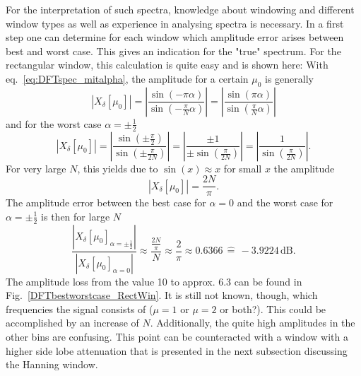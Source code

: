 \documentclass[11pt,a4paper,DIV=12]{scrartcl}
\begin{document}
For the interpretation of such spectra, knowledge about windowing and different
window types as well as experience in analysing spectra is necessary.
%
In a first step one can determine for each window which amplitude error arises
between best and worst case.
%
This gives an indication for the "true" spectrum.
%
For the rectangular window, this calculation is quite easy and is shown here:
%
With eq.~\eqref{eq:DFTspec_mitalpha}, the amplitude for a certain $\mu_0$ is
generally
%
\begin{equation}
|X_\delta[\mu_0]|=\left|\frac{\sin(-\pi\alpha)}{\sin\left(-\frac{\pi}{N}\alpha\right)}\right|
=\left|\frac{\sin(\pi\alpha)}{\sin\left(\frac{\pi}{N}\alpha\right)}\right|
\end{equation}
%
and for the worst case $\alpha=\pm\frac{1}{2}$
%
\begin{equation}
|X_\delta[\mu_0]|=\left|\frac{\sin\left(\pm\frac{\pi}{2}\right)}{\sin\left(\pm\frac{\pi}{2N}\right)}\right|
=\left|\frac{\pm1}{\pm\sin\left(\frac{\pi}{2N}\right)}\right|
=\left|\frac{1}{\sin\left(\frac{\pi}{2N}\right)}\right|.
\end{equation}
%
For very large $N$, this yields due to $\sin(x)\approx x$ for small $x$ the
amplitude
%
\begin{equation}
|X_\delta[\mu_0]|=\frac{2N}{\pi}.
\end{equation}
%
The amplitude error between the best case for $\alpha=0$ and the worst case for
$\alpha=\pm\frac{1}{2}$ is then for large $N$
%
\begin{equation}
\frac{\left|X_\delta[\mu_0]_{\alpha=\pm\frac{1}{2}}\right|}{\left|X_\delta[\mu_0]_{\alpha=0}\right|}\approx\frac{\frac{2N}{\pi}}{N}\approx\frac{2}{\pi}\approx0.6366\,\hat{=}\,-3.9224\,\text{dB}.
\end{equation}
%
The amplitude loss from the value 10 to approx. 6.3 can be found in
Fig.~\ref{DFTbestworstcase_RectWin}.
%
It is still not known, though, which frequencies the signal consists of
($\mu=1$ or $\mu=2$ or both?).
%
This could be accomplished by an increase of $N$.
%
Additionally, the quite high amplitudes in the other bins are confusing.
%
This point can be counteracted with a window with a higher side lobe
attenuation that is presented in the next subsection discussing the Hanning
window.

\end{document}
